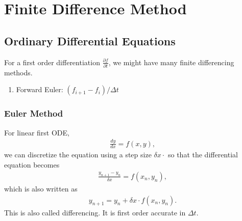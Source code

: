 \documentclass[letterpaper,12pt,english]{sphinxmanual}
\begin{document}
\chapter{Finite Difference Method}
\label{\detokenize{finite-difference/index::doc}}\label{\detokenize{finite-difference/index:finite-difference-method}}

\section{Ordinary Differential Equations}
\label{\detokenize{finite-difference/ode/index::doc}}\label{\detokenize{finite-difference/ode/index:ordinary-differential-equations}}
For a first order differentiation \(\frac{\partial f}{\partial t}\), we might have many finite differencing methods.
\begin{enumerate}
\item {} 
Forward Euler: \((f_{i+1} - f_i)/\Delta t\)

\end{enumerate}


\subsection{Euler Method}
\label{\detokenize{finite-difference/ode/euler::doc}}\label{\detokenize{finite-difference/ode/euler:euler-method}}
For linear first ODE,
\begin{equation*}
\begin{split}\frac{dy}{dx} = f(x, y),\end{split}
\end{equation*}
we can discretize the equation using a step size \(\delta x \cdot\) so that the differential equation becomes
\begin{equation*}
\begin{split}\frac{y_{n+1} - y_n }{ \delta x } = f(x_n, y_n),\end{split}
\end{equation*}
which is also written as
\label{\detokenize{finite-difference/ode/euler:equation-euler-method-discretized-form-y-n-plus-1}}\begin{equation}\label{equation:finite-difference/ode/euler:euler-method-discretized-form-y-n-plus-1}
\begin{split}y_{n+1} = y_n + \delta x \cdot  f(x_n, y_n).\end{split}
\end{equation}
This is also called  differencing. It is first order accurate in \(\Delta t\).
\end{document}

